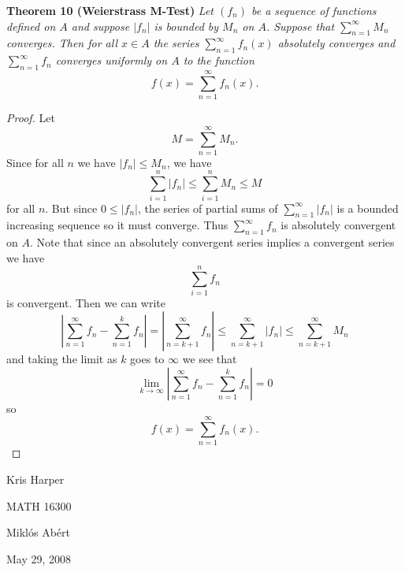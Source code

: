 \documentclass{article}
\begin{document}
\begin{flushleft}
\textbf{Theorem 10 (Weierstrass M-Test)}
\textsl{Let $(f_n)$ be a sequence of functions defined on $A$ and suppose $|f_n|$ is bounded by $M_n$ on $A$. Suppose that $\sum_{n=1}^{\infty} M_n$ converges. Then for all $x \in A$ the series $\sum_{n=1}^{\infty} f_n (x)$ absolutely converges and $\sum_{n=1}^{\infty} f_n$ converges uniformly on $A$ to the function
\[
f(x) = \sum_{n=1}^{\infty} f_n (x).
\]}
\begin{proof}
Let
\[
M = \sum_{n=1}^{\infty} M_n.
\]
Since for all $n$ we have $|f_n| \leq M_n$, we have
\[
\sum_{i=1}^n |f_n| \leq \sum_{i=1}^n M_n \leq M
\]
for all $n$. But since $0 \leq |f_n|$, the series of partial sums of $\sum_{n=1}^{\infty} |f_n|$ is a bounded increasing sequence so it must converge. Thus $\sum_{n=1}^{\infty} f_n$ is absolutely convergent on $A$. Note that since an absolutely convergent series implies a convergent series we have
\[
\sum_{i=1}^n f_n
\]
is convergent. Then we can write
\[
\left | \sum_{n=1}^{\infty} f_n - \sum_{n=1}^k f_n \right | = \left | \sum_{n=k+1}^{\infty} f_n \right | \leq \sum_{n=k+1}^{\infty} |f_n| \leq \sum_{n=k+1}^{\infty} M_n
\]
and taking the limit as $k$ goes to $\infty$ we see that
\[
\lim_{k \rightarrow \infty} \left | \sum_{n=1}^{\infty} f_n - \sum_{n=1}^k f_n \right | = 0
\]
so
\[
f(x) = \sum_{n=1}^{\infty} f_n (x).
\]
\end{proof}

\end{flushleft}

\newpage

\begin{flushright}
Kris Harper

MATH 16300

Mikl\'{o}s Ab\'{e}rt

May 29, 2008
\end{flushright}
\end{document}
